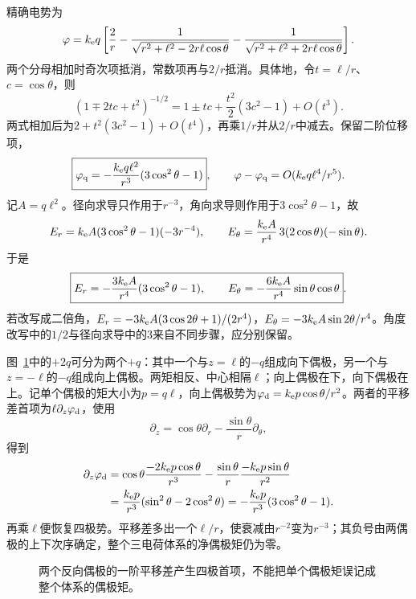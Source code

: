 \begin{solution}
精确电势为
\[\varphi=k_{\rm e} q\left[\frac2r-
\frac1{\sqrt{r^2+\ell^2-2r\ell\cos\theta}}
-\frac1{\sqrt{r^2+\ell^2+2r\ell\cos\theta}}\right].\]
两个分母相加时奇次项抵消，常数项再与$2/r$抵消。具体地，令$t=\ell/r$、$c=\cos\theta$，则
\[(1\mp2tc+t^2)^{-1/2}
=1\pm tc+\frac{t^2}{2}(3c^2-1)+O(t^3).
\]
两式相加后为$2+t^2(3c^2-1)+O(t^4)$，再乘$1/r$并从$2/r$中减去。保留二阶位移项，
\[\boxed{\varphi_{\rm q}=-\frac{k_{\rm e} q\ell^2}{r^3}(3\cos^2\theta-1)},\qquad
\varphi-\varphi_{\rm q}=O(k_{\rm e} q\ell^4/r^5).\]
记$A=q\ell^2$。径向求导只作用于$r^{-3}$，角向求导则作用于$3\cos^2\theta-1$，故
\[E_r=k_{\rm e} A(3\cos^2\theta-1)(-3r^{-4}),\qquad
E_\theta=\frac{k_{\rm e} A}{r^4}\,3(2\cos\theta)(-\sin\theta).\]
于是
\[\boxed{E_r=-\frac{3k_{\rm e} A}{r^4}(3\cos^2\theta-1),\qquad
E_\theta=-\frac{6k_{\rm e} A}{r^4}\sin\theta\cos\theta}.\]
若改写成二倍角，$E_r=-3k_{\rm e} A(3\cos2\theta+1)/(2r^4)$，$E_\theta=-3k_{\rm e} A\sin2\theta/r^4$。角度改写中的$1/2$与径向求导中的$3$来自不同步骤，应分别保留。

图~\ref{fig:es1-e8-s}中的$+2q$可分为两个$+q$：其中一个与$z=\ell$的$-q$组成向下偶极，另一个与$z=-\ell$的$-q$组成向上偶极。两矩相反、中心相隔$\ell$；向上偶极在下，向下偶极在上。记单个偶极的矩大小为$p=q\ell$，向上偶极势为$\varphi_{\rm d}=k_{\rm e} p\cos\theta/r^2$。两者的平移差首项为$\ell\partial_z\varphi_{\rm d}$，使用
\[\partial_z=\cos\theta\partial_r-\frac{\sin\theta}{r}\partial_\theta,\]
得到
\[\begin{aligned}
\partial_z\varphi_{\rm d}
&=\cos\theta\frac{-2k_{\rm e} p\cos\theta}{r^3}
-\frac{\sin\theta}{r}\frac{-k_{\rm e} p\sin\theta}{r^2}\\
&=\frac{k_{\rm e} p}{r^3}(\sin^2\theta-2\cos^2\theta)
=-\frac{k_{\rm e} p}{r^3}(3\cos^2\theta-1).
\end{aligned}\]
再乘$\ell$便恢复四极势。平移差多出一个$\ell/r$，使衰减由$r^{-2}$变为$r^{-3}$；其负号由两偶极的上下次序确定，整个三电荷体系的净偶极矩仍为零。
\begin{figure}[H]\centering
{}
\caption{两个反向偶极的一阶平移差产生四极首项，不能把单个偶极矩误记成整个体系的偶极矩。}\label{fig:es1-e8-s}
\end{figure}


\end{solution}

